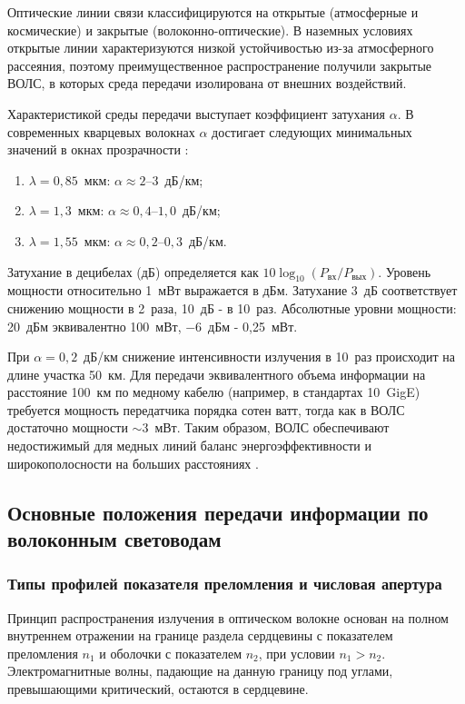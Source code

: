 Оптические линии связи классифицируются на открытые (атмосферные и космические) и закрытые (волоконно-оптические). В наземных условиях открытые линии характеризуются низкой устойчивостью из-за атмосферного рассеяния, поэтому преимущественное распространение получили закрытые ВОЛС, в которых среда передачи изолирована от внешних воздействий.

Характеристикой среды передачи выступает коэффициент затухания $\alpha$. В современных кварцевых волокнах $\alpha$ достигает следующих минимальных значений в окнах прозрачности \cite{Slepov}:
\begin{enumerate}
    \item[--] $\lambda = 0{,}85$~мкм: $\alpha \approx 2$--$3$~дБ/км;
    \item[--] $\lambda = 1{,}3$~мкм: $\alpha \approx 0{,}4$--$1{,}0$~дБ/км;
    \item[--] $\lambda = 1{,}55$~мкм: $\alpha \approx 0{,}2$--$0{,}3$~дБ/км.
\end{enumerate}

Затухание в децибелах (дБ) определяется как $10 \log_{10}(P_{\text{вх}}/P_{\text{вых}})$. Уровень мощности относительно 1~мВт выражается в дБм. Затухание 3~дБ соответствует снижению мощности в 2~раза, 10~дБ - в 10~раз. Абсолютные уровни мощности: 20~дБм эквивалентно 100~мВт, $-6$~дБм - 0,25~мВт.

При $\alpha = 0{,}2$~дБ/км снижение интенсивности излучения в 10~раз происходит на длине участка 50~км. Для передачи эквивалентного объема информации на расстояние 100~км по медному кабелю (например, в стандартах 10~GigE) требуется мощность передатчика порядка сотен ватт, тогда как в ВОЛС достаточно мощности $\sim 3$~мВт. Таким образом, ВОЛС обеспечивают недостижимый для медных линий баланс энергоэффективности и широкополосности на больших расстояниях \cite{Burdin,Slepov}.

\subsection{Основные положения передачи
информации по волоконным световодам}

\subsubsection{Типы профилей показателя преломления и числовая апертура}

Принцип распространения излучения в оптическом волокне основан на полном внутреннем отражении на границе раздела сердцевины с показателем преломления $n_1$ и оболочки с показателем $n_2$, при условии $n_1 > n_2$. Электромагнитные волны, падающие на данную границу под углами, превышающими критический, остаются в сердцевине.

